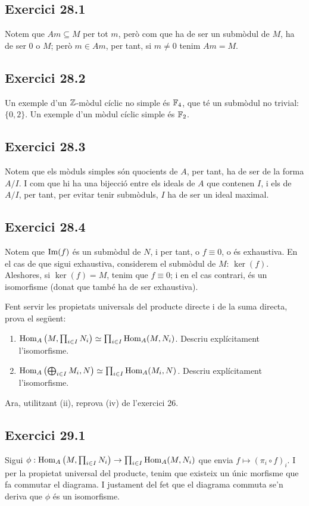 \documentclass[11pt, a4paper]{article}
\begin{document}
\subsection{Exercici 28.1}
Notem que $Am\subseteq M$ per tot $m$, però com que ha de ser un submòdul de $M$, ha de ser $0$ o $M$; però $m\in Am$, per tant, si $m\neq0$ tenim $Am=M$.
\subsection{Exercici 28.2}
Un exemple d'un $\mathbb Z$-mòdul cíclic no simple és $\mathbb F_4$, que té un submòdul no trivial: $\{0,2\}$.
Un exemple d'un mòdul cíclic simple és $\mathbb F_2$.
\subsection{Exercici 28.3}
Notem que els mòduls simples són quocients de $A$, per tant, ha de ser de la forma $A/I$. I com que hi ha una bijecció entre els ideals de $A$ que contenen $I$, i els de $A/I$, per tant, per evitar tenir submòduls, $I$ ha de ser un ideal maximal.
\subsection{Exercici 28.4}
Notem que $\operatorname{Im}(f)$ és un submòdul de $N$, i per tant, o $f\equiv 0$, o és exhaustiva. En el cas de que sigui exhaustiva, considerem el submòdul de $M$: $\ker (f)$. Aleshores, si $\ker(f)=M$, tenim que $f\equiv 0$; i en el cas contrari, és un isomorfisme (donat que també ha de ser exhaustiva).

\newpage
\begin{tcolorbox}[title=\section{Exercici 29}]
    Fent servir les propietats universals del producte directe i de la suma directa, prova el següent:
    \begin{enumerate}
        \item $\mathrm{Hom}_A\left(M, \prod_{i\in I} N_i\right)\simeq \prod_{i\in I}\mathrm{Hom}_A (M,N_i)$. Descriu explícitament l'isomorfisme.
        \item $\mathrm{Hom}_A\left(\bigoplus_{i\in I} M_i, N\right) \simeq \prod_{i\in I} \mathrm{Hom}_A(M_i, N )$. Descriu explícitament l'isomorfisme.
    \end{enumerate}
Ara, utilitzant (ii), reprova (iv) de l'exercici 26.
\end{tcolorbox}
\subsection{Exercici 29.1}
Sigui $\phi:\mathrm{Hom}_A\left(M, \prod_{i\in I} N_i\right)\to \prod_{i\in I}\mathrm{Hom}_A (M,N_i)$ que envia $f\mapsto(\pi_i \circ f)_i$. I per la propietat universal del producte, tenim que existeix un únic morfisme que fa commutar el diagrama. I justament del fet que el diagrama commuta se'n deriva que $\phi$ és un isomorfisme.
\end{document}
